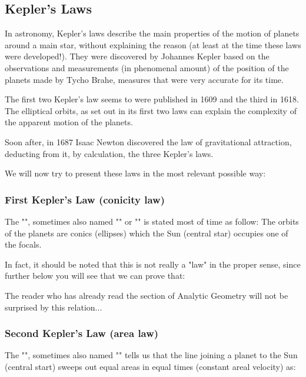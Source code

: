 	\subsection{Kepler's Laws}
	
	In astronomy, Kepler's laws describe the main properties of the motion of planets around a main star, without explaining the reason (at least at the time these laws were developed!). They were discovered by Johannes Kepler based on the observations and measurements (in phenomenal amount) of the position of the planets made by Tycho Brahe, measures that were very accurate for its time.
	
	The first two Kepler's law seems to were published in 1609 and the third in 1618. The elliptical orbits, as set out in its first two laws can explain the complexity of the apparent motion of the planets.
	
	Soon after, in 1687 Isaac Newton discovered the law of gravitational attraction, deducting from it, by calculation, the three Kepler's laws.
	
	We will now try to present these laws in the most relevant possible way:
	
	\subsubsection{First Kepler's Law (conicity law)}
	
	The "", sometimes also named "" or "" is stated most of time as follow: The orbits of the planets are conics (ellipses) which the Sun (central star) occupies one of the focals.
	
	In fact, it should be noted that this is not really a "law" in the proper sense, since further below you will see that we can prove that:
	
	
	\begin{tcolorbox}[title=Remark,colframe=black,arc=10pt]
	The reader who has already read the section of Analytic Geometry will not be surprised by this relation...
	\end{tcolorbox}
	
	\subsubsection{Second Kepler's Law (area law)}
	The "", sometimes also named "" tells us that the line joining a planet to the Sun (central start) sweeps out equal areas in equal times (constant areal velocity) as:
	
